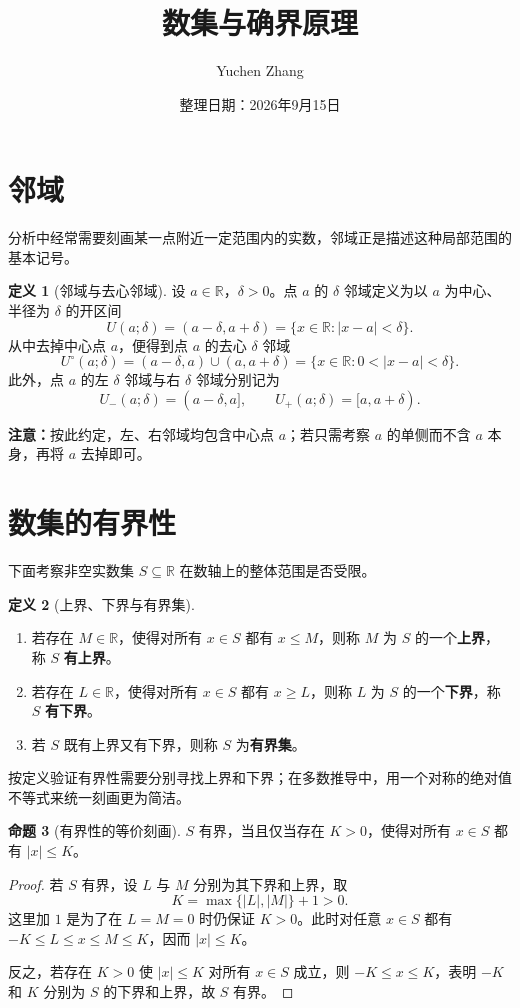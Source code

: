 \documentclass[UTF8, fontset=fandol, a4paper, 12pt]{ctexart}
\title{数集与确界原理}
\author{Yuchen Zhang}
\date{整理日期：2026年9月15日}
\makeatletter
\newcommand{\R}{\mathbb{R}}
\theoremstyle{definition}
\newtheorem{definition}{定义}[section]
\newtheorem{proposition}[definition]{命题}
\renewcommand{\maketitle}{%
  \begin{center}
    {\LARGE\bfseries \@title\par}\vspace{0.6em}
    \@author\par\vspace{0.2em}
    {\small \@date\par}
  \end{center}
}
\makeatother
\begin{document}
\maketitle

\section{邻域}
分析中经常需要刻画某一点附近一定范围内的实数，邻域正是描述这种局部范围的基本记号。

\begin{definition}[邻域与去心邻域]
设 $a\in\R$，$\delta>0$。点 $a$ 的 $\delta$ 邻域定义为以 $a$ 为中心、半径为 $\delta$ 的开区间
\[
  U(a;\delta)=(a-\delta,a+\delta)
  =\{x\in\R:|x-a|<\delta\}.
\]
从中去掉中心点 $a$，便得到点 $a$ 的去心 $\delta$ 邻域
\[
  U^{\circ}(a;\delta)=(a-\delta,a)\cup(a,a+\delta)
  =\{x\in\R:0<|x-a|<\delta\}.
\]
此外，点 $a$ 的左 $\delta$ 邻域与右 $\delta$ 邻域分别记为
\[
  U_-(a;\delta)=(a-\delta,a],\qquad
  U_+(a;\delta)=[a,a+\delta).
\]
\end{definition}
\noindent\textbf{注意：}按此约定，左、右邻域均包含中心点 $a$；若只需考察 $a$ 的单侧而不含 $a$ 本身，再将 $a$ 去掉即可。

\section{数集的有界性}
下面考察非空实数集 $S\subseteq\R$ 在数轴上的整体范围是否受限。

\begin{definition}[上界、下界与有界集]
\leavevmode
\begin{enumerate}
  \item 若存在 $M\in\R$，使得对所有 $x\in S$ 都有 $x\le M$，则称 $M$ 为 $S$ 的一个\textbf{上界}，称 $S$ \textbf{有上界}。
  \item 若存在 $L\in\R$，使得对所有 $x\in S$ 都有 $x\ge L$，则称 $L$ 为 $S$ 的一个\textbf{下界}，称 $S$ \textbf{有下界}。
  \item 若 $S$ 既有上界又有下界，则称 $S$ 为\textbf{有界集}。
\end{enumerate}
\end{definition}

按定义验证有界性需要分别寻找上界和下界；在多数推导中，用一个对称的绝对值不等式来统一刻画更为简洁。

\begin{proposition}[有界性的等价刻画]
$S$ 有界，当且仅当存在 $K>0$，使得对所有 $x\in S$ 都有 $|x|\le K$。
\end{proposition}
\begin{proof}
若 $S$ 有界，设 $L$ 与 $M$ 分别为其下界和上界，取
\[
  K=\max\{|L|,|M|\}+1>0.
\]
这里加 $1$ 是为了在 $L=M=0$ 时仍保证 $K>0$。此时对任意 $x\in S$ 都有 $-K\le L\le x\le M\le K$，因而 $|x|\le K$。

反之，若存在 $K>0$ 使 $|x|\le K$ 对所有 $x\in S$ 成立，则 $-K\le x\le K$，表明 $-K$ 和 $K$ 分别为 $S$ 的下界和上界，故 $S$ 有界。
\end{proof}
\end{document}
